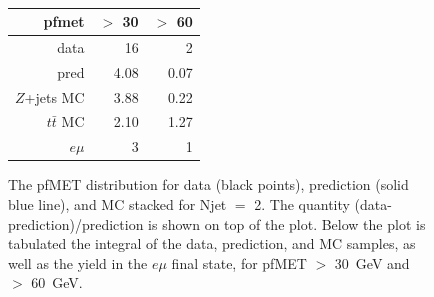 \begin{figure}[hbtp]
  \begin{center}
	\\ \medskip 
    \begin{tabular}{r|r|r}
      pfmet          & $>$ 30 & $>$ 60 \\ \hline
      data           &    16  &     2  \\
      pred           &  4.08  &  0.07  \\
      $Z$+jets MC    &  3.88  &  0.22  \\
      $t\bar{t}$ MC  &  2.10  &  1.27  \\
      $e\mu$         &     3     &  1  \\
   \end{tabular}
    \caption{The pfMET distribution for data (black points), prediction (solid blue line), and MC stacked for Njet $=$ 2. 
      The quantity (data-prediction)/prediction is shown on top of the plot.
      Below the plot is tabulated the integral of the data, prediction, and MC samples, as well as the yield in the $e\mu$
      final state, for pfMET $>$ 30~GeV and $>$ 60~GeV.
    }
    \label{fig:pfpred2}
  \end{center}
\end{figure}


